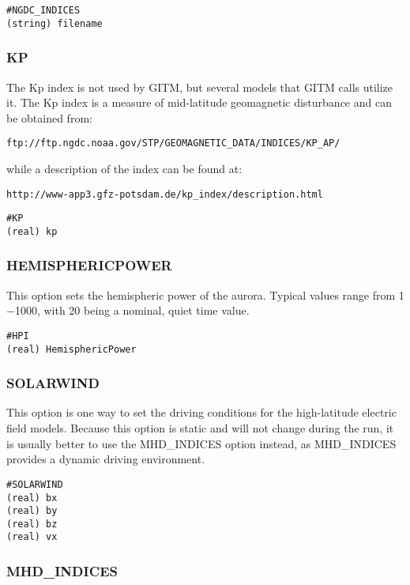\begin{verbatim}
#NGDC_INDICES
(string) filename
\end{verbatim}

\subsubsection{KP}
\label{kp.sec}

The Kp index is not used by GITM, but several models that GITM calls utilize it.  The Kp index is a measure of mid-latitude geomagnetic disturbance and can be obtained from:

 {\tt ftp://ftp.ngdc.noaa.gov/STP/GEOMAGNETIC\_DATA/INDICES/KP\_AP/} 
 
 \noindent while a description of the index can be found at:
 
 {\tt http://www-app3.gfz-potsdam.de/kp\_index/description.html}

\begin{verbatim}
#KP
(real) kp  
\end{verbatim}

\subsubsection{HEMISPHERICPOWER}
\label{hemisphericpower.sec}

This option sets the hemispheric power of the aurora.  Typical values range from 1$-$1000, with 20 being a nominal, quiet time value.

\begin{verbatim}
#HPI
(real) HemisphericPower
\end{verbatim}

\subsubsection{SOLARWIND}
\label{solarwind.sec}

This option is one way to set the driving conditions for the high-latitude electric field models.  Because this option is static and will not change during the run, it is usually better to use the MHD\_INDICES option instead, as MHD\_INDICES provides a dynamic driving environment.

\begin{verbatim}
#SOLARWIND
(real) bx  
(real) by  
(real) bz  
(real) vx  
\end{verbatim}

\subsubsection{MHD\_INDICES}
\label{mhdindices.sec}

